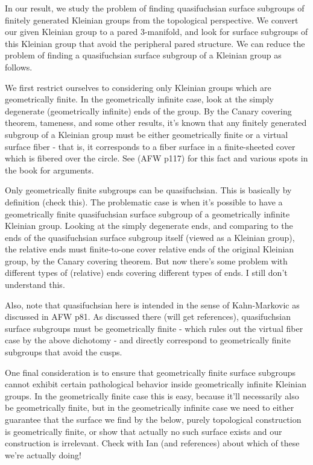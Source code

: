 \documentclass[12pt]{amsart}
\theoremstyle{definition}
\theoremstyle{remark}
\begin{document}
{\tiny

In our result, we study the problem of finding quasifuchsian surface subgroups
of finitely generated Kleinian groups from the topological perspective. We
convert our given Kleinian group to a pared 3-manifold, and look for surface
subgroups of this Kleinian group that avoid the peripheral pared structure. We
can reduce the problem of finding a quasifuchsian surface subgroup of
a Kleinian group as follows.

We first restrict ourselves to considering only Kleinian groups which are
geometrically finite. In the geometrically infinite case, look at the simply
degenerate (geometrically infinite) ends of the group. By the Canary covering
theorem, tameness, and some other results, it's known that any finitely
generated subgroup of a Kleinian group must be either geometrically finite or
a virtual surface fiber - that is, it corresponds to a fiber surface in
a finite-sheeted cover which is fibered over the circle. See (AFW p117) for
this fact and various spots in the book for arguments.


Only geometrically finite subgroups can be quasifuchsian. This is basically by
definition (check this). The problematic case is when it's possible to have
a geometrically finite quasifuchsian surface subgroup of a geometrically
infinite Kleinian group. Looking at the simply degenerate ends, and comparing
to the ends of the quasifuchsian surface subgroup itself (viewed as a Kleinian
group), the relative ends must finite-to-one cover relative ends of the
original Kleinian group, by the Canary covering theorem. But now there's some
problem with different types of (relative) ends covering different types of
ends. I still don't understand this.

Also, note that quasifuchsian here is intended in the sense of Kahn-Markovic as
discussed in AFW p81. As discussed there (will get references), quasifuchsian
surface subgroups must be geometrically finite - which rules out the virtual
fiber case by the above dichotomy - and directly correspond to geometrically
finite subgroups that avoid the cusps.

One final consideration is to ensure that geometrically finite surface
subgroups cannot exhibit certain pathological behavior inside geometrically
infinite Kleinian groups. In the geometrically finite case this is easy,
because it'll necessarily also be geometrically finite, but in the
geometrically infinite case we need to either guarantee that the surface we
find by the below, purely topological construction is geometrically finite, or
show that actually no such surface exists and our construction is irrelevant.
Check with Ian (and references) about which of these we're actually doing!

}
\end{document}
